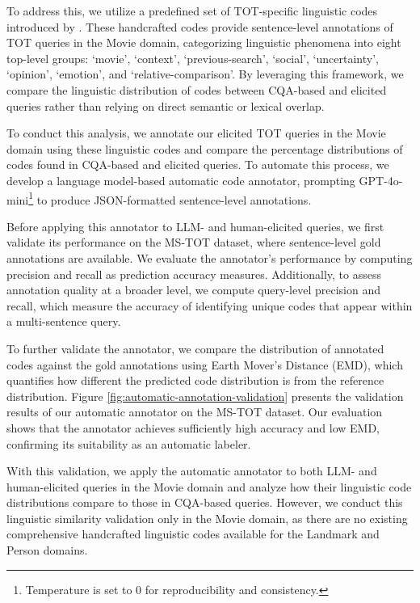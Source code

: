 To address this, we utilize a predefined set of TOT-specific linguistic codes introduced by \citet{arguello-movie-identification}. These handcrafted codes provide sentence-level annotations of TOT queries in the Movie domain, categorizing linguistic phenomena into eight top-level groups: `movie', `context', `previous-search', `social', `uncertainty', `opinion', `emotion', and `relative-comparison'. By leveraging this framework, we compare the linguistic distribution of codes between CQA-based and elicited queries rather than relying on direct semantic or lexical overlap.


To conduct this analysis, we annotate our elicited TOT queries in the Movie domain using these linguistic codes and compare the percentage distributions of codes found in CQA-based and elicited queries. To automate this process, we develop a language model-based automatic code annotator, prompting GPT-4o-mini\footnote{Temperature is set to 0 for reproducibility and consistency.} to produce JSON-formatted sentence-level annotations.



Before applying this annotator to LLM- and human-elicited queries, we first validate its performance on the MS-TOT dataset, where sentence-level gold annotations are available. We evaluate the annotator’s performance by computing precision and recall as prediction accuracy measures. Additionally, to assess annotation quality at a broader level, we compute query-level precision and recall, which measure the accuracy of identifying unique codes that appear within a multi-sentence query.

To further validate the annotator, we compare the distribution of annotated codes against the gold annotations using Earth Mover’s Distance (EMD), which quantifies how different the predicted code distribution is from the reference distribution. Figure \ref{fig:automatic-annotation-validation} presents the validation results of our automatic annotator on the MS-TOT dataset. Our evaluation shows that the annotator achieves sufficiently high accuracy and low EMD, confirming its suitability as an automatic labeler.



With this validation, we apply the automatic annotator to both LLM- and human-elicited queries in the Movie domain and analyze how their linguistic code distributions compare to those in CQA-based queries. However, we conduct this linguistic similarity validation only in the Movie domain, as there are no existing comprehensive handcrafted linguistic codes available for the Landmark and Person domains.
